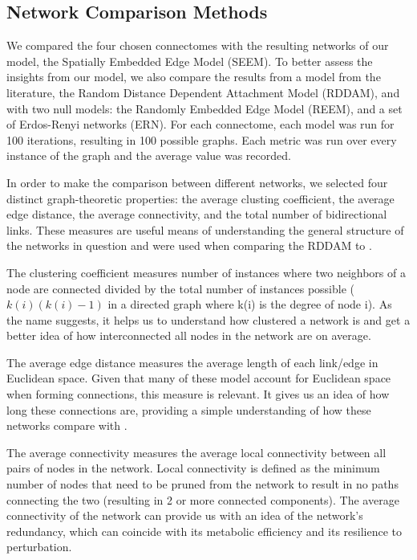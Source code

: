 \subsection{Network Comparison Methods}

We compared the four chosen \ce connectomes with the resulting networks of our model, the Spatially Embedded Edge Model (SEEM). 
To better assess the insights from our model, we also compare the results from a model from the literature, the Random Distance Dependent Attachment Model (RDDAM), and with two null models: the Randomly Embedded Edge Model (REEM), and a set of Erdos-Renyi networks (ERN).
For each connectome, each model was run for 100 iterations, resulting in 100 possible graphs. 
Each metric was run over every instance of the graph and the average value was recorded. 

In order to make the comparison between different networks, we selected four distinct graph-theoretic properties: the average clusting coefficient, the average edge distance, the average connectivity, and the total number of bidirectional links. 
These measures are useful means of understanding the general structure of the networks in question and were used when comparing the RDDAM to \ce \citep{Itzhack}.

The clustering coefficient measures number of instances where two neighbors of a node are connected divided by the total number of instances possible ($k(i)(k(i)-1)$ in a directed graph where k(i) is the degree of node i). 
As the name suggests, it helps us to understand how clustered a network is and get a better idea of how interconnected all nodes in the network are on average. 

The average edge distance measures the average length of each link/edge in Euclidean space. 
Given that many of these model account for Euclidean space when forming connections, this measure is relevant. 
It gives us an idea of how long these connections are, providing a simple understanding of how these networks compare with \ce. 

The average connectivity measures the average local connectivity between all pairs of nodes in the network.
Local connectivity is defined as the minimum number of nodes that need to be pruned from the network to result in no paths connecting the two (resulting in 2 or more connected components).
The average connectivity of the network can provide us with an idea of the network's redundancy, which can coincide with its metabolic efficiency and its resilience to perturbation.

